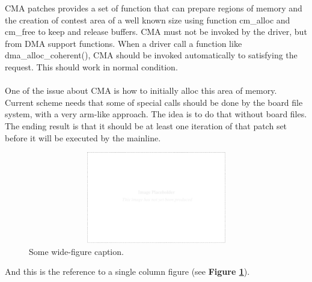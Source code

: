 \documentclass[a4paper,10pt]{article}
\begin{document}
\begin{multicols}{2}
CMA patches provides a set of function that can prepare regions of memory and the creation of contest area of a well known size
using function cm\_alloc and cm\_free to keep and release buffers.
CMA must not be invoked by the driver, but from DMA support functions. When a driver call a function like dma\_alloc\_coherent(), CMA
should be invoked automatically to satisfying the request.
This should work in normal condition.\\
\\
One of the issue about CMA is how to initially alloc this area of memory. Current scheme needs that some of special calls 
should be done by the board file system, with a very arm-like approach. The idea is to do that without board files.
The ending result is that it should be at least one iteration of that patch set before it will be executed by the mainline.

\begin{figure}[t]
  \centering
 \includegraphics[width=16cm, height=4cm]{./eps/placeholder.eps}
 \caption{Some wide-figure caption.}
 \label{fig:myfigure2}
\end{figure}

And this is the reference to a single column figure (see {\bf Figure
\ref{fig:myfigure2}}).


\end{multicols}
\end{document}
